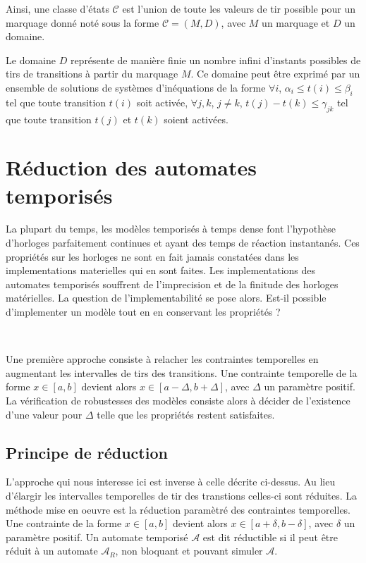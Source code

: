 \documentclass{article}
\begin{document}
        Ainsi, une classe d'états $\mathcal{C}$ est l'union de toute les valeurs
        de tir possible pour un marquage donné noté sous la forme $\mathcal{C} =
        (M,D)$, avec $M$ un marquage et $D$ un domaine.

        Le domaine $D$ représente de manière finie un nombre infini d'instants
        possibles de tirs de transitions à partir du marquage $M$. Ce domaine
        peut être exprimé par un ensemble de solutions de systèmes d'inéquations
        de la forme $\forall i$, $\alpha_i \leq t(i) \leq \beta_i$ tel que toute
        transition $t(i)$ soit activée, $\forall j, k$, $j \neq k$, $t(j) - t(k)
        \leq \gamma_{jk}$ tel que toute transition $t(j)$ et $t(k)$ soient
        activées.

  \section{Réduction des automates temporisés }
  \label{sec:shrinking-timed-automata}

    La plupart du temps, les modèles temporisés à temps dense font l'hypothèse
    d'horloges parfaitement continues et ayant des temps de réaction
    instantanés. Ces propriétés sur les horloges ne sont en fait jamais
    constatées dans les implementations materielles qui en sont faites. Les
    implementations des automates temporisés souffrent de l'imprecision et de la
    finitude des horloges matérielles. La question de l'implementabilité se pose
    alors. Est-il possible d'implementer un modèle tout en en conservant les
    propriétés ?
    
    ~

    Une première approche \cite{dewulf04} consiste à relacher les contraintes
    temporelles en augmentant les intervalles de tirs des transitions. Une
    contrainte temporelle de la forme $x \in [a, b]$ devient alors $x \in
    [a-\Delta, b+\Delta]$, avec $\Delta$ un paramètre positif. La vérification
    de robustesses des modèles consiste alors à décider de l'existence d'une
    valeur pour $\Delta$ telle que les propriétés restent satisfaites.
    
    \subsection{Principe de réduction}
    
      L'approche qui nous interesse ici \cite{sankur14} est inverse à celle
      décrite ci-dessus. Au lieu d'élargir les intervalles temporelles de tir
      des transtions celles-ci sont réduites. La méthode mise en oeuvre est la
      réduction paramètré des contraintes temporelles. Une contrainte de la
      forme $x \in [a, b]$ devient alors $x \in [a+\delta, b-\delta]$, avec
      $\delta$ un paramètre positif. Un automate temporisé $\mathcal{A}$ est dit
      réductible si il peut être réduit à un automate $\mathcal{A}_R$, non
      bloquant et pouvant simuler $\mathcal{A}$.
    
\end{document}
